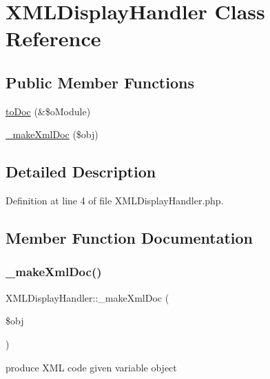 \hypertarget{classXMLDisplayHandler}{}\section{X\+M\+L\+Display\+Handler Class Reference}
\label{classXMLDisplayHandler}
\subsection*{Public Member Functions}
\begin{DoxyCompactItemize}
\item 
\hyperlink{classXMLDisplayHandler_adebe0869fea845f4007acc2b84e2d24c}{to\+Doc} (\&\$o\+Module)
\item 
\hyperlink{classXMLDisplayHandler_a1b3cb79d65e9ddb997dfaaeea70809ae}{\+\_\+make\+Xml\+Doc} (\$obj)
\end{DoxyCompactItemize}


\subsection{Detailed Description}


Definition at line 4 of file X\+M\+L\+Display\+Handler.\+php.



\subsection{Member Function Documentation}
\hypertarget{classXMLDisplayHandler_a1b3cb79d65e9ddb997dfaaeea70809ae}{}\label{classXMLDisplayHandler_a1b3cb79d65e9ddb997dfaaeea70809ae} 
\subsubsection{\texorpdfstring{\+\_\+make\+Xml\+Doc()}{\_makeXmlDoc()}}
{\footnotesize\ttfamily X\+M\+L\+Display\+Handler\+::\+\_\+make\+Xml\+Doc (\begin{DoxyParamCaption}\item[{}]{\$obj }\end{DoxyParamCaption})}

produce X\+ML code given variable object~\newline

